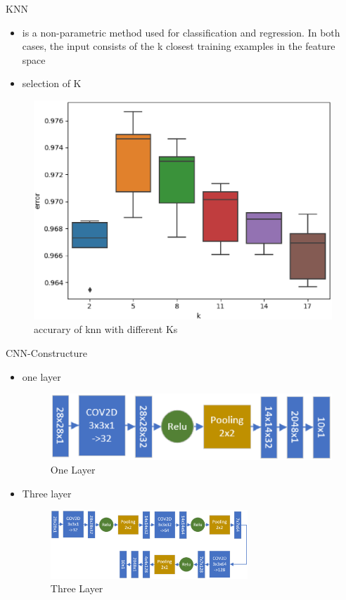 \documentclass[
 size=12pt,
 paper=smartboard, %
 mode=present, %
 display=slides, %
style=tuliplab,
pauseslide,
fleqn,leqno]{powerdot}
\begin{document}
\begin{slide}{KNN}
  \begin{itemize}
    \item is a non-parametric method used for classification and regression.
    In both cases, the input consists of the k closest training examples in
    the feature space \pause
    \item selection of K
  \end{itemize}
  \begin{figure}[h]
    \centering
    \includegraphics[width=0.5\linewidth]{figures/knn-k.eps}
    \caption{accurary of knn with different Ks}
    \label{fig:knn-k}
  \end{figure}
\end{slide}

\begin{slide}{CNN-Constructure}
  \begin{itemize}
    \item one layer \pause
    \begin{figure}[h]
      \centering
      \includegraphics[width=0.5\linewidth]{figures/layer1.eps}
      \caption{One Layer}
      \label{fig:one-layer}
    \end{figure}
    \pause
    \item Three layer \pause
    \begin{figure}[h]
      \centering
      \includegraphics[width=0.7\textwidth]{figures/layer3.eps}
      \caption{Three Layer}
      \label{fig:three-layer}
    \end{figure}  
  \end{itemize}
\end{slide}
\end{document}
